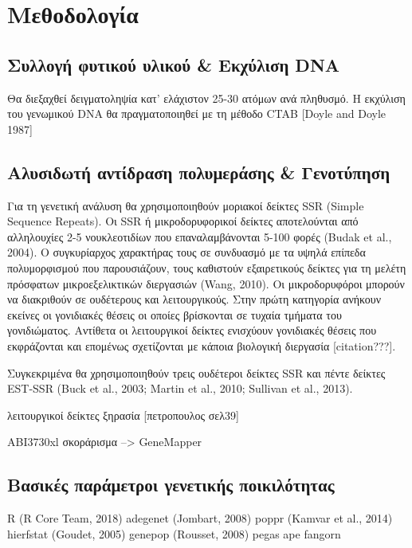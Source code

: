 \documentclass[12pt,a4paper,]{report}
\begin{document}
\section{Μεθοδολογία}

\hypertarget{----dna}{%
\subsection{Συλλογή φυτικού υλικού \& Εκχύλιση DNA}\label{----dna}}

Θα διεξαχθεί δειγματοληψία κατ' ελάχιστον 25-30 ατόμων ανά πληθυσμό. Η
εκχύλιση του γενωμικού DNA θα πραγματοποιηθεί με τη μέθοδο CTAB {[}Doyle
and Doyle 1987{]}

\hypertarget{---}{%
\subsection{Αλυσιδωτή αντίδραση πολυμεράσης \& Γενοτύπηση}\label{---}}

Για τη γενετική ανάλυση θα χρησιμοποιηθούν μοριακοί δείκτες SSR (Simple
Sequence Repeats). Οι SSR ή μικροδορυφορικοί δείκτες αποτελούνται από
αλληλουχίες 2-5 νουκλεοτιδίων που επαναλαμβάνονται 5-100 φορές (Budak et
al., 2004). Ο συγκυρίαρχος χαρακτήρας τους σε συνδυασμό με τα υψηλά
επίπεδα πολυμορφισμού που παρουσιάζουν, τους καθιστούν εξαιρετικούς
δείκτες για τη μελέτη πρόσφατων μικροεξελικτικών διεργασιών (Wang,
2010). Οι μικροδορυφόροι μπορούν να διακριθούν σε ουδέτερους και
λειτουργικούς. Στην πρώτη κατηγορία ανήκουν εκείνες οι γονιδιακές θέσεις
οι οποίες βρίσκονται σε τυχαία τμήματα του γονιδιώματος. Αντίθετα οι
λειτουργικοί δείκτες ενισχύουν γονιδιακές θέσεις που εκφράζονται και
επομένως σχετίζονται με κάποια βιολογική διεργασία {[}citation???{]}.

Συγκεκριμένα θα χρησιμοποιηθούν τρεις ουδέτεροι δείκτες SSR και πέντε
δείκτες EST-SSR (Buck et al., 2003; Martin et al., 2010; Sullivan et
al., 2013).

λειτουργικοί δείκτες ξηρασία {[}πετροπουλος σελ39{]}

ABI3730xl σκοράρισμα --\textgreater{} GeneMapper

\hypertarget{---}{%
\subsection{Βασικές παράμετροι γενετικής ποικιλότητας}\label{---}}

R (R Core Team, 2018) adegenet (Jombart, 2008) poppr (Kamvar et al.,
2014) hierfstat (Goudet, 2005) genepop (Rousset, 2008) pegas ape fangorn
\end{document}
